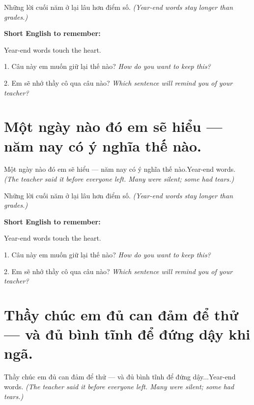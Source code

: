 \begin{baihoc}
Những lời cuối năm ở lại lâu hơn điểm số.
\textit{(Year-end words stay longer than grades.)}
\end{baihoc}

\begin{ghinhoanh}
\textbf{Short English to remember:}

Year-end words touch the heart.

\end{ghinhoanh}

\begin{tuhocnhanh}
1. Câu này em muốn giữ lại thế nào? \textit{How do you want to keep this?}

2. Em sẽ nhớ thầy cô qua câu nào? \textit{Which sentence will remind you of your teacher?}
\end{tuhocnhanh}
\ngancach


\section{Một ngày nào đó em sẽ hiểu — năm nay có ý nghĩa thế nào.}
\begin{truyen}{Một ngày nào đó em sẽ hiểu — năm nay có ý nghĩa thế nào.}{Year-end words.}
\textit{(The teacher said it before everyone left. Many were silent; some had tears.)}
\end{truyen}

\begin{baihoc}
Những lời cuối năm ở lại lâu hơn điểm số.
\textit{(Year-end words stay longer than grades.)}
\end{baihoc}

\begin{ghinhoanh}
\textbf{Short English to remember:}

Year-end words touch the heart.

\end{ghinhoanh}

\begin{tuhocnhanh}
1. Câu này em muốn giữ lại thế nào? \textit{How do you want to keep this?}

2. Em sẽ nhớ thầy cô qua câu nào? \textit{Which sentence will remind you of your teacher?}
\end{tuhocnhanh}
\ngancach


\section{Thầy chúc em đủ can đảm để thử — và đủ bình tĩnh để đứng dậy khi ngã.}
\begin{truyen}{Thầy chúc em đủ can đảm để thử — và đủ bình tĩnh để đứng dậy...}{Year-end words.}
\textit{(The teacher said it before everyone left. Many were silent; some had tears.)}
\end{truyen}

